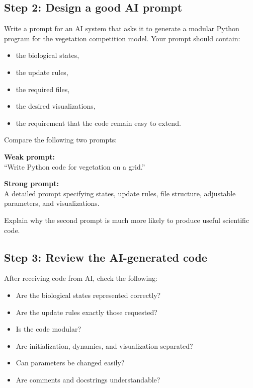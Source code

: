 \documentclass[paper=letter, fontsize=12pt]{article}
\numberwithin{equation}{section}
\begin{document}
\subsection*{Step 2: Design a good AI prompt}

\begin{aibox}
Write a prompt for an AI system that asks it to generate a modular Python program for the vegetation competition model. Your prompt should contain:
\begin{itemize}
\item the biological states,
\item the update rules,
\item the required files,
\item the desired visualizations,
\item the requirement that the code remain easy to extend.
\end{itemize}
\end{aibox}

\begin{aibox}
Compare the following two prompts:

\medskip
\textbf{Weak prompt:} \\
``Write Python code for vegetation on a grid.''

\medskip
\textbf{Strong prompt:} \\
A detailed prompt specifying states, update rules, file structure, adjustable parameters, and visualizations.

\medskip
Explain why the second prompt is much more likely to produce useful scientific code.
\end{aibox}

\subsection*{Step 3: Review the AI-generated code}

\begin{taskbox}
After receiving code from AI, check the following:
\begin{itemize}
\item Are the biological states represented correctly?
\item Are the update rules exactly those requested?
\item Is the code modular?
\item Are initialization, dynamics, and visualization separated?
\item Can parameters be changed easily?
\item Are comments and docstrings understandable?
\end{itemize}
\end{taskbox}
\end{document}
